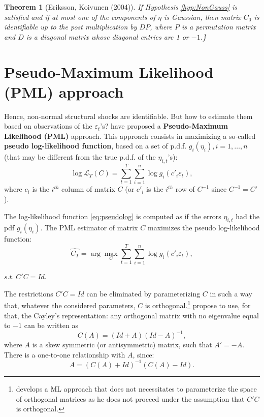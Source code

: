 \documentclass[
  12pt,
]{book}
\newtheorem{theorem}{Theorem}[chapter]
\theoremstyle{definition}
\theoremstyle{definition}
\theoremstyle{definition}
\theoremstyle{definition}
\theoremstyle{remark}
\begin{document}
\begin{theorem}[Eriksson, Koivunen (2004)]
\protect\hypertarget{thm:EK2004}{}\label{thm:EK2004}If Hypothesis \ref{hyp:NonGauss} is satisfied and if at most one of the components of \(\eta\) is Gaussian, then matrix \(C_0\) is identifiable up to the post multiplication by \(DP\), where \(P\) is a permutation matrix and \(D\) is a diagonal matrix whose diagonal entries are 1 or \(-1\).\}
\end{theorem}

\section{Pseudo-Maximum Likelihood (PML) approach}\label{pseudo-maximum-likelihood-pml-approach}

Hence, non-normal structural shocks are identifiable. But how to estimate them based on observations of the \(\varepsilon_t\)'s? \citet{Gourieroux_Monfort_Renne_2017} have proposed a \textbf{Pseudo-Maximum Likelihood (PML)} approach. This approach consists in maximizing a so-called \textbf{pseudo log-likelihood function}, based on a set of p.d.f. \(g_i (\eta_i), i=1,\ldots,n\) (that may be different from the true p.d.f. of the \(\eta_{i,t}\)'s):
\begin{equation}
\log \mathcal{L}_T (C) = \sum^T_{t=1} \sum^n_{i=1} \log g_i (c'_i \varepsilon_t),\label{eq:pseudolog}
\end{equation}
where \(c_i\) is the \(i^{th}\) column of matrix \(C\) (or \(c'_i\) is the \(i^{th}\) row of \(C^{-1}\) since \(C^{-1}=C'\)).

The log-likelihood function \eqref{eq:pseudolog} is computed as if the errors \(\eta_{i,t}\) had the pdf \(g_i (\eta_i)\). The PML estimator of matrix \(C\) maximizes the pseudo log-likelihood function:
\begin{equation}
\widehat{C_T} = \arg \max_C \sum^T_{t=1} \sum^n_{i=1} \log g_i (c'_i \varepsilon_t),\label{eq:optimprob}
\end{equation}

\centerline{$s.t. \;C'C = Id.$}

The restrictions \(C'C = Id\) can be eliminated by parameterizing \(C\) in such a way that, whatever the considered parameters, \(C\) is orthogonal.\footnote{\citet{Jarocinski_2021} develops a ML approach that does not necessitates to parameterize the space of orthogonal matrices as he does not proceed under the assumption that \(C'C\) is orthogonal.} \citet{Gourieroux_Monfort_Renne_2017} propose to use, for that, the Cayley's representation: any orthogonal matrix with no eigenvalue equal to \(-1\) can be written as
\begin{equation}
C(A) = (Id+A) (Id-A)^{-1},
\end{equation}
where \(A\) is a skew symmetric (or antisymmetric) matrix, such that \(A'=-A\). There is a one-to-one relationship with \(A\), since:
\begin{equation}
A = (C(A)+Id)^{-1} (C(A)-Id).
\end{equation}
\end{document}
